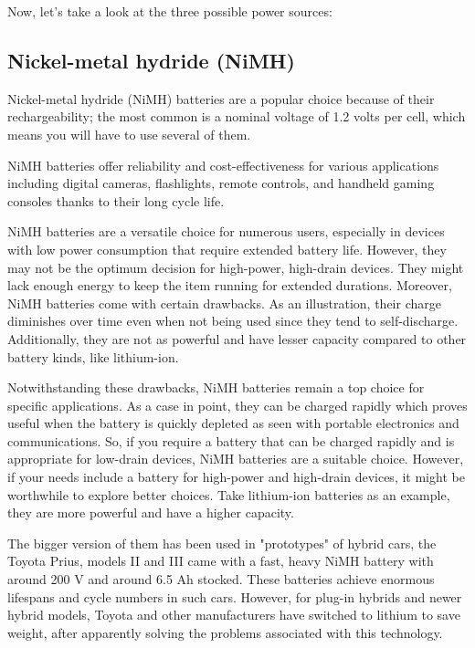 Now, let's take a look at the three possible power sources:



\subsection{Nickel-metal hydride (NiMH)}

Nickel-metal hydride (NiMH) batteries are a popular choice because of their rechargeability; the most common is a nominal voltage of 1.2 volts per cell, which means you will have to use several of them.

NiMH batteries offer reliability and cost-effectiveness for various applications including digital cameras, flashlights, remote controls, and handheld gaming consoles thanks to their long cycle life.

NiMH batteries are a versatile choice for numerous users, especially in devices with low power consumption that require extended battery life. However, they may not be the optimum decision for high-power, high-drain devices. They might lack enough energy to keep the item running for extended durations. Moreover, NiMH batteries come with certain drawbacks. As an illustration, their charge diminishes over time even when not being used since they tend to self-discharge. Additionally, they are not as powerful and have lesser capacity compared to other battery kinds, like lithium-ion.\cite{Babu:2023}

Notwithstanding these drawbacks, NiMH batteries remain a top choice for specific applications. As a case in point, they can be charged rapidly which proves useful when the battery is quickly depleted as seen with portable electronics and communications. So, if you require a battery that can be charged rapidly and is appropriate for low-drain devices, NiMH batteries are a suitable choice. However, if your needs include a battery for high-power and high-drain devices, it might be worthwhile to explore better choices. Take lithium-ion batteries as an example, they are more powerful and have a higher capacity.\cite{Babu:2023}

The bigger version of them has been used in "prototypes" of hybrid cars, the Toyota Prius, models II and III came with a fast, heavy NiMH battery with around 200 V and around 6.5 Ah stocked. These batteries achieve enormous lifespans and cycle numbers in such cars. However, for plug-in hybrids and newer hybrid models, Toyota and other manufacturers have switched to lithium to save weight, after apparently solving the problems associated with this technology. \cite{Scherer:2022}

